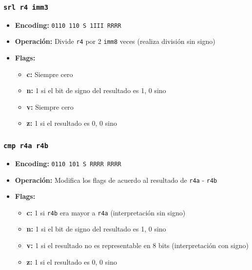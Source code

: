 \documentclass{article}
\begin{document}
\subsubsection{\texttt{srl r4 imm3}}
\begin{itemize}
    \item \textbf{Encoding:} \texttt{0110 110 S 1III RRRR}
    \item \textbf{Operación:} Divide \texttt{r4} por 2 \texttt{imm8} veces (realiza división sin signo)
    \item \textbf{Flags:}
    \begin{itemize}
        \item \textbf{c:} Siempre cero
        \item \textbf{n:} 1 si el bit de signo del resultado es 1, 0 sino
        \item \textbf{v:} Siempre cero
        \item \textbf{z:} 1 si el resultado es 0, 0 sino 
    \end{itemize}
\end{itemize}

\subsubsection{\texttt{cmp r4a r4b}}
\begin{itemize}
    \item \textbf{Encoding:} \texttt{0110 101 S RRRR RRRR}
    \item \textbf{Operación:} Modifica los flags de acuerdo al resultado de \texttt{r4a} - \texttt{r4b}
    \item \textbf{Flags:}
        \begin{itemize}
            \item \textbf{c:} 1 si \texttt{r4b} era mayor a \texttt{r4a} (interpretación sin signo)
            \item \textbf{n:} 1 si el bit de signo del resultado es 1, 0 sino
            \item \textbf{v:} 1 si el resultado no es representable en 8 bits (interpretación con signo)
            \item \textbf{z:} 1 si el resultado es 0, 0 sino
        \end{itemize}
\end{itemize}
\end{document}
